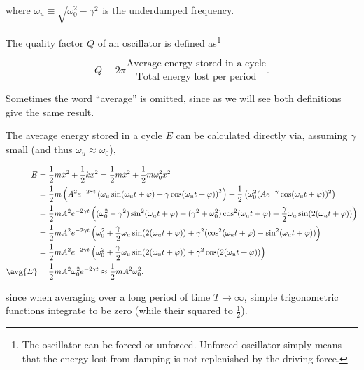 \documentclass[english,a4paper,12pt]{report}
\begin{document}
where \(\omega _{u} \equiv \sqrt{\omega _{0}^2- \gamma ^2 } \) is the underdamped frequency.

The quality factor \(Q\) of an oscillator is defined as\footnote{The oscillator can be forced or unforced. Unforced oscillator simply means that the energy lost from damping is not replenished by the driving force.}  

\begin{equation}
    Q \equiv 2\pi \frac{\text{Average energy stored in a cycle}}{\text{Total energy lost per period}}.
\end{equation}

Sometimes the word ``average'' is omitted, since as we will see both definitions give the same result.

The average energy stored in a cycle \(E\) can be calculated directly via, assuming \(\gamma \) small (and thus \(\omega _{u} \approx \omega _{0}  \)),

\begin{equation}
    \begin{aligned} 
    E &= \frac{1}{2}m \dot{x} ^2 + \frac{1}{2}kx^2 = \frac{1}{2}m \dot{x} ^2+ \frac{1}{2} m \omega _{0}^2x^2    \\ 
    &= \frac{1}{2}m\left( A^2e^{-2\gamma t} \left(  \omega _{u}\sin (\omega _{u}t+\varphi  ) + \gamma \cos (\omega _{u}t+\varphi  )  \right)^2\right) + \frac{1}{2}\left( \omega _{0}^2   (Ae^{-\gamma } \cos (\omega _{u} t+\varphi ))^2\right) \\ 
    &= \frac{1}{2}mA^2e^{-2\gamma t} \left((\omega _{0}^2-\gamma ^2 ) \sin ^2(\omega _{u}t+\varphi)  + (\gamma ^2+\omega _{0}^2) \cos ^2(\omega _{u}t+\varphi  ) + \frac{\gamma }{2} \omega _{u}\sin (2(\omega _{u}t+\varphi  )) \right)\\
    &= \frac{1}{2}mA^2e^{-2\gamma t} \left( \omega _{0}^2 + \frac{\gamma }{2}\omega _{u}\sin (2(\omega _{u}t + \varphi  )) + \gamma ^2(\cos ^2(\omega _{u}t+\varphi  )- \sin ^2(\omega _{u}t+\varphi  )) \right) \\
    &= \frac{1}{2}mA^2e^{-2\gamma t} \left( \omega _{0}^2+ \frac{\gamma }{2}\omega _{u}\sin (2(\omega _{u}t+\varphi  )) + \gamma ^2\cos (2(\omega _{u}t+\varphi  )) \right) \\
    \avg{E} &= \frac{1}{2}mA^2\omega _{0}^2e^{-2\gamma t} \approx \frac{1}{2}mA^2\omega _{0}^2.  
     \end{aligned} 
\end{equation}

since when averaging over a long period of time \(T \to \infty\), simple trigonometric functions integrate to be zero (while their squared to \(\frac{1}{2} \)). 
\end{document}
